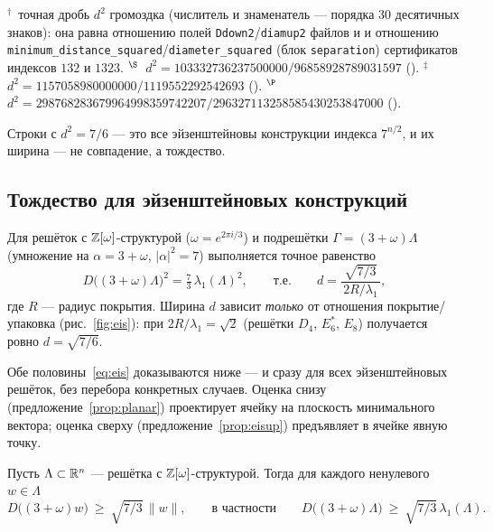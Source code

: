 \begin{center}
\smallskip
\begin{minipage}{0.92\textwidth}\footnotesize
$^{\dagger}$~точная дробь $d^2$ громоздка (числитель и знаменатель --- порядка
$30$ десятичных знаков): она равна отношению полей
\texttt{Ddown2}/\texttt{diamup2} файлов 
и  и отношению
\texttt{minimum\_distance\_squared}/\texttt{diameter\_squared} (блок
\texttt{separation}) сертификатов индексов $132$ и $1323$.\quad
$^{\S}$~$d^2=103332736237500000/96858928789031597$
().\quad
$^{\ddagger}$~$d^2=1157058980000000/1119552292542693$
().\quad
$^{\P}$~$d^2=298768283679964998359742207/296327113258585430253847000$
().
\end{minipage}
\end{center}

Строки с $d^2=7/6$ --- это все эйзенштейновы конструкции индекса $7^{n/2}$, и
их ширина --- не совпадение, а тождество.

\subsection{Тождество для эйзенштейновых конструкций}
\label{ssec:eis}

Для решёток с $\mathbb{Z}[\omega]$-структурой ($\omega=e^{2\pi i/3}$) и подрешётки
$\Gamma=(3+\omega)\Lambda$ (умножение на $\alpha=3+\omega$, $|\alpha|^2=7$)
выполняется точное равенство
\begin{equation}\label{eq:eis}
D\bigl((3+\omega)\Lambda\bigr)^2=\tfrac73\,\lambda_1(\Lambda)^2,
\qquad\text{т.е.}\qquad
d=\frac{\sqrt{7/3}}{\,2R/\lambda_1\,},
\end{equation}
где $R$ --- радиус покрытия. Ширина $d$ зависит \emph{только} от отношения
покрытие/упаковка (рис.~\ref{fig:eis}): при $2R/\lambda_1=\sqrt2$ (решётки
$D_4$, $E_6^*$, $E_8$) получается ровно $d=\sqrt{7/6}$.

Обе половины~\eqref{eq:eis} доказываются ниже --- и сразу для всех
эйзенштейновых решёток, без перебора конкретных случаев. Оценка снизу
(предложение~\ref{prop:planar}) проектирует ячейку на плоскость минимального
вектора; оценка сверху (предложение~\ref{prop:eisup}) предъявляет в ячейке
явную точку.

\begin{proposition}\label{prop:planar}
Пусть $\Lambda\subset\mathbb{R}^n$ --- решётка с $\mathbb{Z}[\omega]$-структурой.
Тогда для каждого ненулевого $w\in\Lambda$
\[
D\bigl((3+\omega)w\bigr)\ \ge\ \sqrt{7/3}\,\|w\|,
\qquad\text{в частности}\qquad
D\bigl((3+\omega)\Lambda\bigr)\ \ge\ \sqrt{7/3}\,\lambda_1(\Lambda).
\]
\end{proposition}

